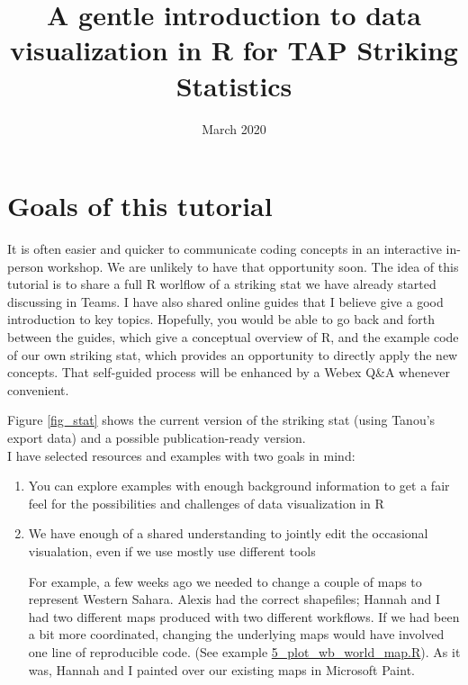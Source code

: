 \documentclass{article}
\title{A gentle introduction to data visualization in R for TAP Striking
  Statistics}
\date{March 2020}
\begin{document}
\maketitle

\section{Goals of this tutorial}

It is often easier and quicker to communicate coding concepts
    in an interactive in-person workshop. We are unlikely to have that
    opportunity soon. The idea of this tutorial is to share a full
    R worlflow of a striking stat we have already started discussing in
    Teams. I have also shared online guides that I believe give a good
    introduction to key topics. Hopefully, you would be able to go
    back and forth between the guides, which give a conceptual overview
    of R, and the example code of our own striking stat, which
    provides an opportunity to directly apply the new concepts. That
    self-guided process will be enhanced by a Webex Q\&A whenever convenient.

 Figure \ref{fig_stat} shows the current version of the striking stat
 (using Tanou's export data) and a possible publication-ready version.\\
 
I have selected resources and examples with two goals in mind:
\begin{enumerate}
\item You can explore examples with enough background information to
  get a fair feel for the possibilities and challenges of data
  visualization in R
  \item We have enough of a shared understanding to jointly edit the
    occasional visualation, even if we use mostly use different
    tools

    \begin{framed}
    For example, a few weeks ago we needed to change a couple
    of maps to represent Western Sahara. Alexis had the correct
    shapefiles; Hannah and I had two different maps produced with two
    different workflows. If we had been a bit more coordinated,
    changing the underlying maps would have involved one line of reproducible
    code. (See example \url{5_plot_wb_world_map.R}). As it was, Hannah and I painted
    over our existing maps in Microsoft Paint.
  \end{framed}
\end{enumerate}
    
\end{document}
